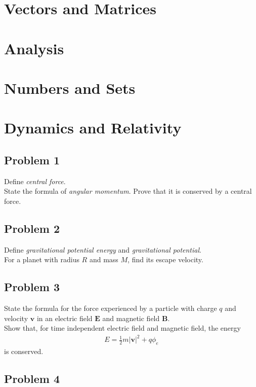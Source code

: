 \documentclass[a4paper]{article}
\begin{document}
\newpage

\section{Vectors and Matrices}

\newpage

\section{Analysis}

\newpage

\section{Numbers and Sets}

\newpage

\section{Dynamics and Relativity}

\subsection{Problem 1}
Define \emph{central force}.\\
State the formula of \emph{angular momentum}. Prove that it is conserved by a central force.

\subsection{Problem 2}
Define \emph{gravitational potential energy} and \emph{gravitational potential}.\\
For a planet with radius $R$ and mass $M$, find its escape velocity.

\subsection{Problem 3}
State the formula for the force experienced by a particle with charge $q$ and velocity $\mathbf{v}$ in an electric field $\mathbf{E}$ and magnetic field $\mathbf{B}$.\\
Show that, for time independent electric field and magnetic field, the energy
\begin{equation*}
\begin{aligned}
E=\frac{1}{2}m|\mathbf{v}|^2 + q \phi_e
\end{aligned}
\end{equation*}
is conserved.

\subsection{Problem 4}




\newpage
\end{document}
